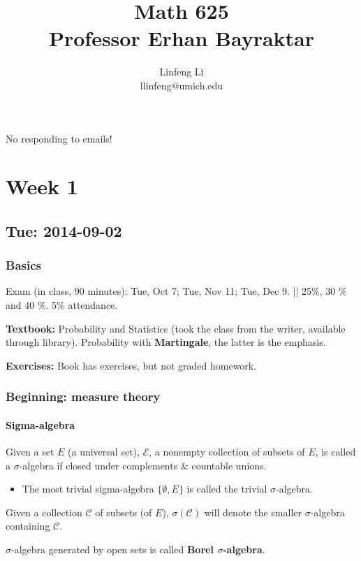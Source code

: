 \documentclass[11pt]{article}
\title{Math 625\\
Professor Erhan Bayraktar}
\author{Linfeng Li \\ llinfeng@umich.edu}
\begin{document}
\maketitle
No responding to emails!
\section{Week 1}
\subsection{Tue: 2014-09-02}
\subsubsection{Basics}
Exam (in class, 90 minutes): Tue, Oct 7; Tue, Nov 11; Tue, Dec 9.   || 25\%, 30
\% and 40 \%.  
5\% attendance. 


\textbf{Textbook: } Probability and Statistics (took the class from the writer,
available through library).  
Probability with \textbf{Martingale}, the latter is the emphasis.

\textbf{Exercises:} Book has exercises, but not graded homework.

\subsubsection{Beginning: measure theory}
\paragraph{Sigma-algebra}
Given a set $E$ (a universal set), $\mathcal E$, a nonempty collection of
subsets of $E$, is called a $\sigma$-algebra if closed under complements \&
countable unions. 

\begin{itemize}
  \item The most trivial sigma-algebra  $\{\emptyset, E\}$ is called the trivial
$\sigma$-algebra. 
\end{itemize}

\begin{definition}
  Given a collection $\mathcal C$ of subsets (of $E$), $\sigma(\mathcal C)$ will
  denote the smaller $\sigma$-algebra containing $\mathcal C$. 
\end{definition}

\begin{definition}
  $\sigma$-algebra generated by open sets  is called \textbf{Borel
  $\sigma$-algebra}.
\end{definition}
\end{document}
